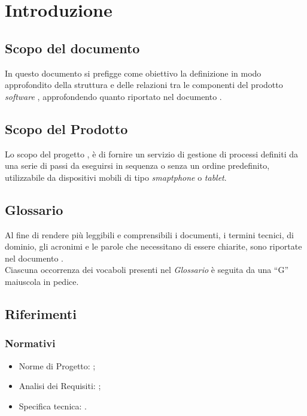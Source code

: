 \section{Introduzione}
\subsection{Scopo del documento}
In questo documento si prefigge come obiettivo la definizione in modo approfondito della struttura e delle relazioni tra le componenti del prodotto \textit{software} \progetto{}, approfondendo quanto riportato nel documento \SpecificaTecnica{}.
\subsection{Scopo del Prodotto}
Lo scopo del progetto \progetto{}, è di fornire un servizio di gestione di processi definiti da una serie di passi da eseguirsi in sequenza o senza un ordine predefinito, utilizzabile da dispositivi mobili di tipo \textit{smaptphone} o \textit{tablet}.
\subsection{Glossario}
Al fine di rendere più leggibili e comprensibili i documenti, i termini tecnici, di dominio, gli acronimi e le parole che necessitano di essere chiarite, sono riportate nel documento \Glossario{}.\\
Ciascuna occorrenza dei vocaboli presenti nel \textit{Glossario} è seguita da una ``G'' maiuscola in pedice.
\subsection{Riferimenti}
\subsubsection{Normativi}
\begin{itemize}
\item Norme di Progetto: \NormeDiProgetto{};
\item Analisi dei Requisiti: \AnalisiDeiRequisiti{};
\item Specifica tecnica: \SpecificaTecnica{}.
\end{itemize}
